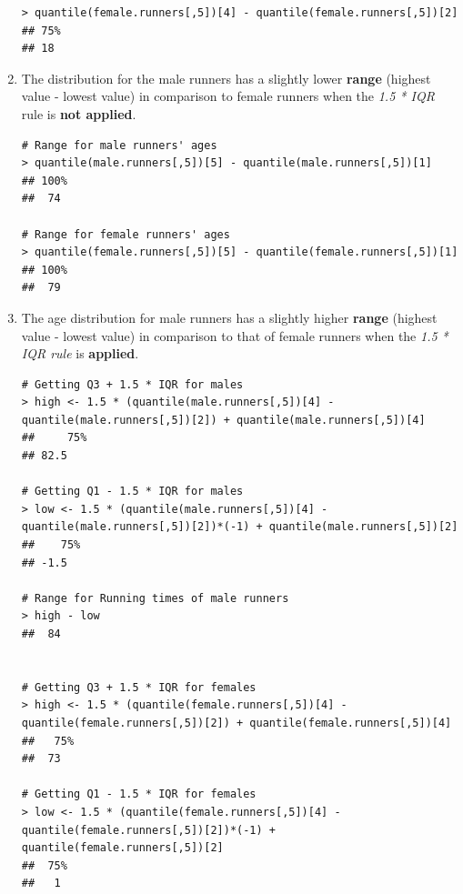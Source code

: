 \documentclass[12pt,letterpaper,titlepage,en-US]{article}
\begin{document}
\begin{enumerate}
\begin{knitrout}
\begin{kframe}
\begin{verbatim}
> quantile(female.runners[,5])[4] - quantile(female.runners[,5])[2]
## 75% 
## 18 
\end{verbatim}
\end{kframe}
\end{knitrout}


\item The distribution for the male runners has a slightly lower \textbf{range} (highest value - lowest value) in comparison to female runners when the \emph{1.5 * IQR} rule is \textbf{not applied}.
\begin{knitrout}
\color{fgcolor}
\begin{kframe}

\begin{verbatim}
# Range for male runners' ages
> quantile(male.runners[,5])[5] - quantile(male.runners[,5])[1]
## 100% 
##  74 
  
# Range for female runners' ages
> quantile(female.runners[,5])[5] - quantile(female.runners[,5])[1]
## 100% 
##  79 
\end{verbatim}
\end{kframe}
\end{knitrout}



\item The age distribution for male runners has a slightly higher \textbf{range} (highest value - lowest value) in comparison to that of female runners when the \emph{1.5 * IQR rule} is \textbf{applied}.

\begin{knitrout}
\color{fgcolor}
\begin{kframe}
\begin{verbatim}
# Getting Q3 + 1.5 * IQR for males
> high <- 1.5 * (quantile(male.runners[,5])[4] -
quantile(male.runners[,5])[2]) + quantile(male.runners[,5])[4]
##     75% 
## 82.5

# Getting Q1 - 1.5 * IQR for males
> low <- 1.5 * (quantile(male.runners[,5])[4] -
quantile(male.runners[,5])[2])*(-1) + quantile(male.runners[,5])[2]
##    75% 
## -1.5

# Range for Running times of male runners
> high - low
##  84


# Getting Q3 + 1.5 * IQR for females
> high <- 1.5 * (quantile(female.runners[,5])[4] -
quantile(female.runners[,5])[2]) + quantile(female.runners[,5])[4]
##   75% 
##  73 

# Getting Q1 - 1.5 * IQR for females
> low <- 1.5 * (quantile(female.runners[,5])[4] -
quantile(female.runners[,5])[2])*(-1) + quantile(female.runners[,5])[2]
##  75% 
##   1 


\end{verbatim}
\end{kframe}
\end{knitrout}
\end{enumerate}
\end{document}
